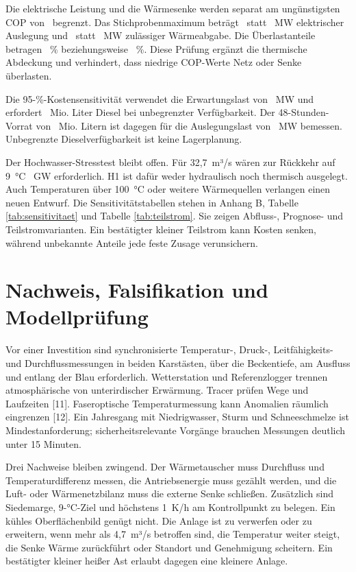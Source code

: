 Die elektrische Leistung und die Wärmesenke werden separat am ungünstigsten COP von \McCopLow~begrenzt. Das Stichprobenmaximum beträgt \ElectricitySampleMax~statt \DesignElectric~MW elektrischer Auslegung und \AirRejectionSampleMax~statt \DesignAirRejection~MW zulässiger Wärmeabgabe. Die Überlastanteile betragen \ElectricityOverloadPercent~\% beziehungsweise \AirRejectionOverloadPercent~\%. Diese Prüfung ergänzt die thermische Abdeckung und verhindert, dass niedrige COP-Werte Netz oder Senke überlasten.

Die 95-\%-Kostensensitivität verwendet die Erwartungslast von \PElectric~MW und erfordert \AvailabilityBackupFuel~Mio. Liter Diesel bei unbegrenzter Verfügbarkeit. Der 48-Stunden-Vorrat von \FuelReserve~Mio. Litern ist dagegen für die Auslegungslast von \DesignElectric~MW bemessen. Unbegrenzte Dieselverfügbarkeit ist keine Lagerplanung.

Der Hochwasser-Stresstest bleibt offen. Für 32,7~m³/s wären zur Rückkehr auf 9~°C \QFloodStress~GW erforderlich. H1 ist dafür weder hydraulisch noch thermisch ausgelegt. Auch Temperaturen über 100~°C oder weitere Wärmequellen verlangen einen neuen Entwurf. Die Sensitivitätstabellen stehen in Anhang B, Tabelle \ref{tab:sensitivitaet} und Tabelle \ref{tab:teilstrom}. Sie zeigen Abfluss-, Prognose- und Teilstromvarianten. Ein bestätigter kleiner Teilstrom kann Kosten senken, während unbekannte Anteile jede feste Zusage verunsichern.

\section{Nachweis, Falsifikation und Modellprüfung}

Vor einer Investition sind synchronisierte Temperatur-, Druck-, Leitfähigkeits- und Durchflussmessungen in beiden Karstästen, über die Beckentiefe, am Ausfluss und entlang der Blau erforderlich. Wetterstation und Referenzlogger trennen atmosphärische von unterirdischer Erwärmung. Tracer prüfen Wege und Laufzeiten [11]. Faseroptische Temperaturmessung kann Anomalien räumlich eingrenzen [12]. Ein Jahresgang mit Niedrigwasser, Sturm und Schneeschmelze ist Mindestanforderung; sicherheitsrelevante Vorgänge brauchen Messungen deutlich unter 15 Minuten.

Drei Nachweise bleiben zwingend. Der Wärmetauscher muss Durchfluss und Temperaturdifferenz messen, die Antriebsenergie muss gezählt werden, und die Luft- oder Wärmenetzbilanz muss die externe Senke schließen. Zusätzlich sind Siedemarge, 9-°C-Ziel und höchstens 1~K/h am Kontrollpunkt zu belegen. Ein kühles Oberflächenbild genügt nicht. Die Anlage ist zu verwerfen oder zu erweitern, wenn mehr als 4,7~m³/s betroffen sind, die Temperatur weiter steigt, die Senke Wärme zurückführt oder Standort und Genehmigung scheitern. Ein bestätigter kleiner heißer Ast erlaubt dagegen eine kleinere Anlage.

